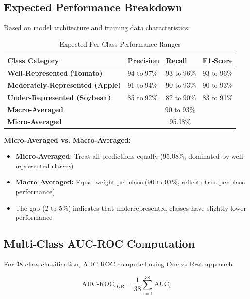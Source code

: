 \documentclass[11pt,a4paper]{article}
\begin{document}
\subsection{Expected Performance Breakdown}

Based on model architecture and training data characteristics:

\begin{table}[H]
\centering
\caption{Expected Per-Class Performance Ranges}
\label{tab:class_performance}
\begin{tabularx}{\textwidth}{>{\bfseries}l X X X}
\toprule
\rowcolor{primarynavy}
\color{white}Class Category & \color{white}Precision & \color{white}Recall & \color{white}F1-Score \\
\midrule
Well-Represented (Tomato) & 94 to 97\% & 93 to 96\% & 93 to 96\% \\
\rowcolor{iceblue}
Moderately-Represented (Apple) & 91 to 94\% & 90 to 93\% & 90 to 93\% \\
Under-Represented (Soybean) & 85 to 92\% & 82 to 90\% & 83 to 91\% \\
\midrule
Macro-Averaged & \multicolumn{3}{c}{90 to 93\%} \\
\rowcolor{iceblue}
Micro-Averaged & \multicolumn{3}{c}{95.08\%} \\
\bottomrule
\end{tabularx}
\end{table}

\textbf{Micro-Averaged vs. Macro-Averaged:}
\begin{itemize}
    \item \textbf{Micro-Averaged:} Treat all predictions equally (95.08\%, dominated by well-represented classes)
    \item \textbf{Macro-Averaged:} Equal weight per class (90 to 93\%, reflects true per-class performance)
    \item The gap (2 to 5\%) indicates that underrepresented classes have slightly lower performance
\end{itemize}

\subsection{Multi-Class AUC-ROC Computation}

For 38-class classification, AUC-ROC computed using One-vs-Rest approach:

\begin{equation}
\text{AUC-ROC}_{\text{OvR}} = \frac{1}{38} \sum_{i=1}^{38} \text{AUC}_i
\end{equation}
\end{document}

